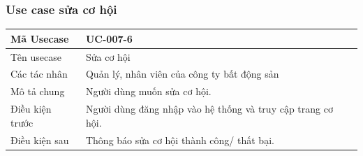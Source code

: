 \documentclass[12pt,a4paper]{article}
\begin{document}
    \subsubsection*{Use case sửa cơ hội}
    \begin{table}[H]
        \centering
        \begin{tabular}{|p{3.5cm}|p{11.5cm}|c|}
            \hline
            Mã Usecase      & UC-007-6                                                    \\
            \hline
            Tên usecase     & Sửa cơ hội                                                  \\
            \hline
            Các tác nhân    & Quản lý, nhân viên của công ty bất động sản                 \\
            \hline
            Mô tả chung     & Người dùng muốn sửa cơ hội.                                 \\
            \hline

            Điều kiện trước & Người dùng đăng nhập vào hệ thống và truy cập trang cơ hội. \\
            \hline

            Điều kiện sau   & Thông báo sửa cơ hội thành công/ thất bại.                  \\
            \hline


\end{tabular}
\end{table}
\end{document}

